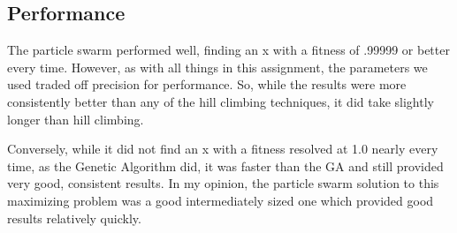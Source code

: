 \subsection{Performance}

The particle swarm performed well, finding an x with a fitness of .99999 or better every time.  However, as with all things in this assignment, the parameters we used traded off precision for performance.  So, while the results were more consistently better than any of the hill climbing techniques, it did take slightly longer than hill climbing.


Conversely, while it did not find an x with a fitness resolved at 1.0 nearly every time, as the Genetic Algorithm did, it was faster than the GA and still provided very good, consistent results.  In my opinion, the particle swarm solution to this maximizing problem was a good intermediately sized one which provided good results relatively quickly.
